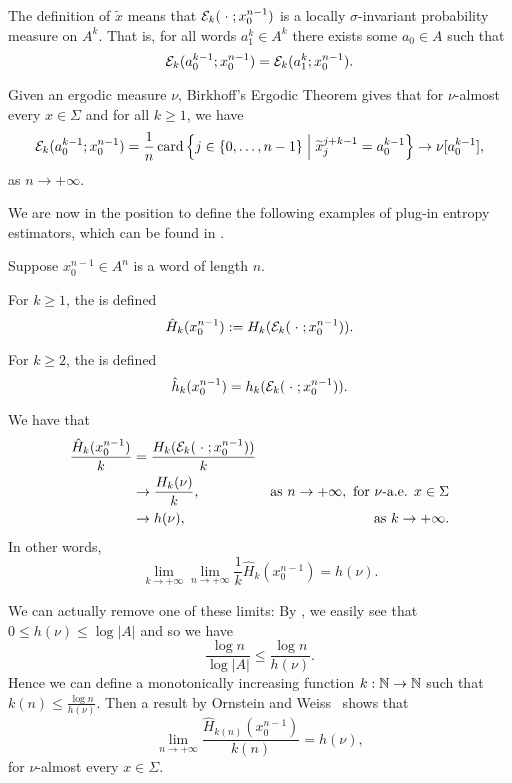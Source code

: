 The definition of $\tilde{x}$ means that $\mathcal{E}_k(\mathrel{}\cdot\mathrel{}; x_0^{n - 1})$ is a locally $\sigma$-invariant probability measure on $A^k$. That is, for all words $a_1^k \in A^k$ there exists some $a_0 \in A$ such that
\[
	\mathcal{E}_k(a_0^{k - 1}; x_0^{n - 1}) = \mathcal{E}_k(a_1^k; x_0^{n - 1}).
\]

Given an ergodic measure $\nu$, Birkhoff's Ergodic Theorem gives that for $\nu$-almost every $x \in \Sigma$ and for all $k \geq 1$, we have
\[
	\mathcal{E}_k(a_0^{k - 1}; x_0^{n - 1}) = \frac{1}{n}\operatorname{card}\left\{j \in \{0, \dots, n - 1\} \mathrel{}\middle|\mathrel{} \widetilde{x}_j^{j + k - 1} = a_0^{k - 1} \right\} \to \nu[a_0^{k - 1}],
\]
as $n \to +\infty$.

We are now in the position to define the following examples of plug-in entropy estimators, which can be found in \cite[Definition 2.1]{chazottes-gabrielle:large-deviations}.

\begin{definition}
	Suppose $x_0^{n - 1} \in A^n$ is a word of length $n$.
	
	For $k \geq 1$, the  is defined
	\[
		\hat{H}_k(x_0^{n - 1}) := H_k(\mathcal{E}_k(\mathrel{}\cdot\mathrel{}; x_0^{n - 1})).
	\]
	
	For $k \geq 2$, the  is defined
	\[
		\hat{h}_k(x_0^{n - 1}) = h_k(\mathcal{E}_k(\mathrel{}\cdot\mathrel{}; x_0^{n - 1})).
	\]
\end{definition}

We have that
\begin{align*}
	\frac{\hat{H}_k(x_0^{n - 1})}{k} &= \frac{H_k(\mathcal{E}_k(\mathrel{}\cdot\mathrel{}; x_0^{n - 1}))}{k} \\
		&\to \frac{H_k(\nu)}{k}, & \text{as } n \to +\infty, \text{ for } \nu \text{-a.e. } x \in \Sigma  \\
		&\to h(\nu),	& \text{as } k \to +\infty.
\end{align*}
In other words,
\[
	\lim_{k \to +\infty} \lim_{n \to +\infty}{\frac{1}{k} \hat{H}_k(x_0^{n - 1})} = h(\nu).
\]

We can actually remove one of these limits: By , we easily see that $0 \leq h(\nu) \leq \log{|A|}$ and so we have
\[
	\frac{\log{n}}{\log{|A|}} \leq \frac{\log{n}}{h(\nu)}.
\]
Hence we can define a monotonically increasing function $k : \mathbb{N} \to \mathbb{N}$ such that $k(n) \leq \frac{\log{n}}{h(\nu)}$. Then a result by Ornstein and Weiss~\cite{shields:ergodic} shows that
\[
	\lim_{n \to +\infty}{\frac{\hat{H}_{k(n)}(x_0^{n -1})}{k(n)}} = h(\nu),
\]
for $\nu$-almost every $x \in \Sigma$.


